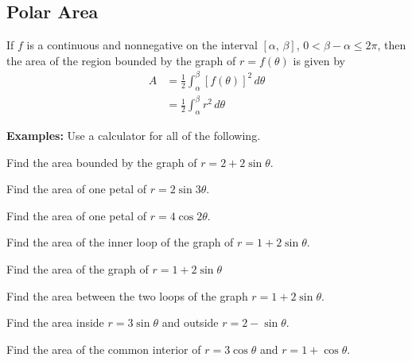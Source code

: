 \documentclass[addpoints, 12pt]{exam}
\begin{document}
\newpage
{}
\subsection*{Polar Area}
\begin{tcolorbox}[title= AREA IN POLAR FORM ,black,sharp corners,colback=white,colbacktitle=white,coltitle=black]

    If $f$ is a continuous and nonnegative on the interval $[\alpha,\,\beta]$, $0<\beta-\alpha\le2\pi$, then the area of the region bounded by the graph of $r=f(\theta)$ is given by
    \begin{align*}
        A   &= \frac{1}{2}\int_\alpha^\beta[f(\theta)]^2\,d\theta\\
            &= \frac{1}{2}\int_\alpha^\beta r^2\,d\theta
    \end{align*}
    
\end{tcolorbox}
\vspace{.1cm}
\noindent\textbf{Examples:} Use a calculator for all of the following.
\begin{questions}
    \question Find the area bounded by the graph of $r=2+2\sin\theta.$
    
    \question Find the area of one petal of $r=2\sin3\theta$.
    
    \question Find the area of one petal of $r=4\cos2\theta$.
    
    \newpage
    
    \question Find the area of the inner loop of the graph of $r=1+2\sin\theta$.
    
    \question Find the area of the graph of $r=1+2\sin\theta$
    
    \question Find the area between the two loops of the graph $r=1+2\sin\theta$.
    
    \newpage
    
    \question Find the area inside $r=3\sin\theta$ and outside $r=2-\sin\theta$.
    
    \question Find the area of the common interior of $r=3\cos\theta$ and $r=1+\cos\theta$.
\end{questions}
\end{document}

